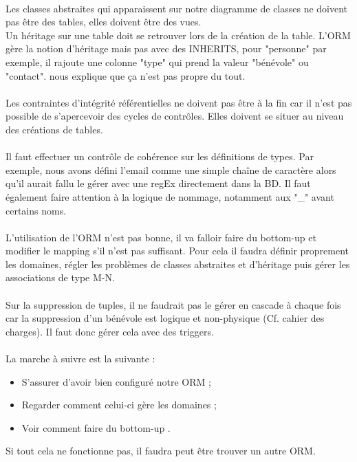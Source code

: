 \documentclass [a4paper] {article}
\begin{document}
\paragraph*{}
Les classes abstraites qui apparaissent sur notre diagramme de classes ne doivent pas être des tables, elles doivent être des vues. \\
Un héritage sur une table doit se retrouver lors de la création de la table. L'ORM gère la notion d'héritage mais pas avec des INHERITS, pour "personne" par exemple, il rajoute une colonne "type" qui prend la valeur "bénévole" ou "contact". \nomTuteurPedago{} nous explique que ça n'est pas propre du tout.
\paragraph*{}
Les contraintes d'intégrité référentielles ne doivent pas être à la fin car il n'est pas possible de s’apercevoir des cycles de contrôles. Elles doivent se situer au niveau des créations de tables.
\paragraph*{}
Il faut effectuer un contrôle de cohérence sur les définitions de types. Par exemple, nous avons défini l'email comme une simple chaîne de caractère alors qu'il aurait fallu le gérer avec une regEx directement dans la BD. Il faut également faire attention à la logique de nommage, notamment aux "\_" avant certains noms.
\paragraph*{}
L'utilisation de l'ORM n'est pas bonne, il va falloir faire du bottom-up et modifier le mapping s'il n'est pas suffisant. Pour cela il faudra définir proprement les domaines, régler les problèmes de classes abstraites et d'héritage puis gérer les associations de type M-N.
\paragraph*{}
Sur la suppression de tuples, il ne faudrait pas le gérer en cascade à chaque fois car la suppression d'un bénévole est logique et non-physique (Cf. cahier des charges). Il faut donc gérer cela avec des triggers.
\paragraph*{}
La marche à suivre est la suivante :
\begin{itemize}
\item S'assurer d'avoir bien configuré notre ORM ;
\item Regarder comment celui-ci gère les domaines ;
\item Voir comment faire du bottom-up .
\end{itemize}
Si tout cela ne fonctionne pas, il faudra peut être trouver un autre ORM.






\newpage
\end{document}
